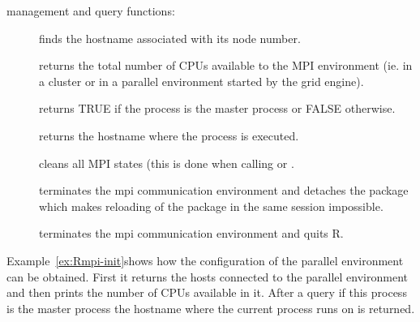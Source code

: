  management and query functions:

\begin{description}
\item[] finds the hostname associated with its node
  number.
\item[] returns the total number of CPUs
  available to the MPI environment (ie. in a cluster or in a parallel
  environment started by the grid engine).
\item[] returns TRUE if the process is the
  master process or FALSE otherwise. 
\item[] returns the hostname where the
  process is executed.
\item[] cleans all MPI states (this is done when
  calling  or .
\item[] terminates the mpi communication
  environment and detaches the  package which makes reloading of
  the package  in the same session impossible.  
\item[] terminates the mpi communication
  environment and quits R.  
\end{description}

Example~\ref{ex:Rmpi-init}shows how the configuration of the
parallel environment can be obtained. First it returns the hosts
connected to the parallel environment and then prints the number of
CPUs available in it. After a query if this process is the master
process the hostname where the current process runs on is
returned. 

